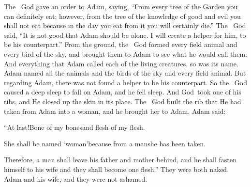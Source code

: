 \begin{inparaenum}
   The \lord\ God gave an order to Adam, saying, ``From every tree of the Garden you can definitely eat;%
   however, from the tree of the knowledge of good and evil you shall not eat because in the day you eat from it you will certainly die.''%
   The \lord\ God said, ``It is not good that Adam should be alone. I will create a helper for him, to be his counterpart.''%
   From the ground, the \lord\ God formed every field animal and every bird of the sky, and brought them to Adam to see what he would call them. And everything that Adam called each of the living creatures, so was its name.%
   Adam named all the animals and the birds of the sky and every field animal. But regarding Adam, there was not found a helper to be his counterpart.%
   So the \lord\ God caused a deep sleep to fall on Adam, and he fell sleep. And God\understood{}\ took one of his ribs, and He closed up the skin in its place.%
   The \lord\ God built the rib that He had taken from Adam into a woman, and he brought her to Adam.%
   Adam said:%

  \pc{}``At last!\pa{}Bone of my bones\pa{}and flesh of my flesh.%

  \pc{}She shall be named `woman'\pa{}because from a man\pa{}she has been taken.%

   Therefore, a man shall leave his father and mother behind, and he shall fasten himself to his wife and they shall become one flesh.''%
   They were both naked, Adam and his wife, and they were not ashamed.%
\end{inparaenum}
